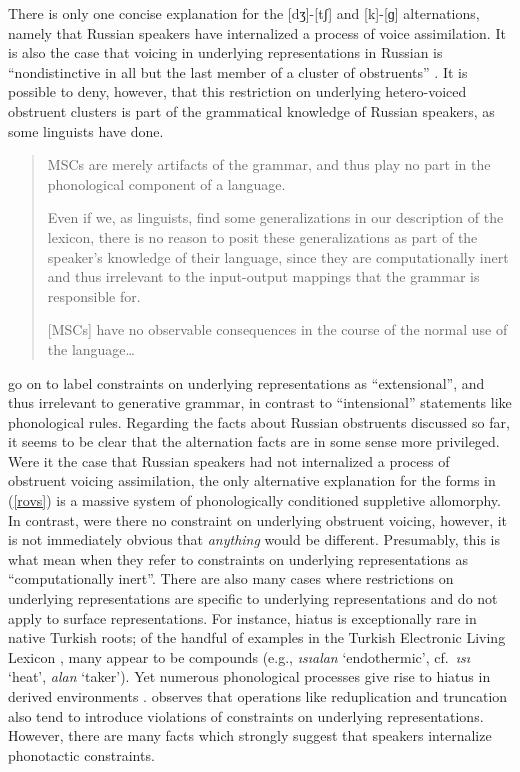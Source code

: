 There is only one concise explanation for the [dʒ]-[tʃ] and [k]-[ɡ] alternations, namely that Russian speakers have internalized a process of voice assimilation.
It is also the case that voicing in underlying representations in Russian is ``nondistinctive in all but the last member of a cluster of obstruents'' \citep[283]{A74}.
It is possible to deny, however, that this restriction on underlying hetero-voiced obstruent clusters is part of the grammatical knowledge of Russian speakers, as some linguists have done.

\begin{quote}
MSCs are merely artifacts of the grammar, and thus play no part in the phonological component of a language. \citep[302]{Clayton1976}

Even if we, as linguists, find some generalizations in our description of the lexicon, there is no reason to posit these generalizations as part of the speaker's knowledge of their language, since they are computationally inert and thus irrelevant to the input-output mappings that the grammar is responsible for. \citep[17f.]{PE}

[MSCs] have no observable consequences in the course of the normal use of the language\ldots{} \citep[320]{Zimmer1969}
\end{quote}

\noindent
\citeauthor{PE} go on to label constraints on underlying representations as ``extensional'', and thus irrelevant to generative grammar, in contrast to ``intensional'' statements like phonological rules.
Regarding the facts about Russian obstruents discussed so far, it seems to be clear that the alternation facts are in some sense more privileged.
Were it the case that Russian speakers had not internalized a process of obstruent voicing assimilation, the only alternative explanation for the forms in (\ref{rovs}) is a massive system of phonologically conditioned suppletive allomorphy.
In contrast, were there no constraint on underlying obstruent voicing, however, it is not immediately obvious that \emph{anything} would be different. 
Presumably, this is what \citeauthor{PE} mean when they refer to constraints on underlying representations as ``computationally inert''.
There are also many cases where restrictions on underlying representations are specific to underlying representations and do not apply to surface representations.
For instance, hiatus is exceptionally rare in native Turkish roots; of the handful of examples in the Turkish Electronic Living Lexicon \citep{TELL}, many appear to be compounds (e.g., \emph{ısıalan} `endothermic', cf.~\emph{ısı} `heat', \emph{alan} `taker').
Yet numerous phonological processes give rise to hiatus in derived environments \citep[e.g.,][]{Kabak2007b}.
\citet{Silverman2000} observes that operations like reduplication and truncation also tend to introduce violations of constraints on underlying representations.
However, there are many facts which strongly suggest that speakers internalize phonotactic constraints.

